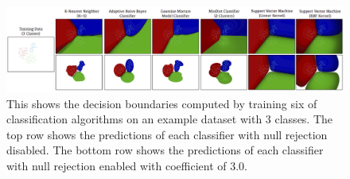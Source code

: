 \begin{figure}
	[h] \centering 
	\includegraphics[width=150mm]{figures/content/grt-null.jpg} \caption{This shows the decision boundaries computed by training six of classification algorithms on an example dataset with 3 classes. The top row shows the predictions of each classifier with null rejection disabled. The bottom row shows the predictions of each classifier with null rejection enabled with coefficient of 3.0. \cite{grt-spec} } \label{fg:grt:null} 
\end{figure}

